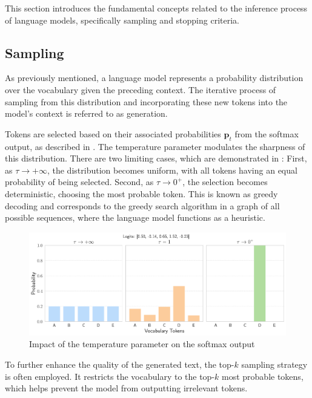 This section introduces the fundamental concepts related to the inference process of language models, specifically sampling and stopping criteria.

\subsection{Sampling}\label{sec:sampling}

As previously mentioned, a language model represents a probability distribution over the vocabulary given the preceding context. The iterative process of sampling from this distribution and incorporating these new tokens into the model's context is referred to as generation.

Tokens are selected based on their associated probabilities \(\mathbf{p}_t\) from the softmax output, as described in . The temperature parameter modulates the sharpness of this distribution. There are two limiting cases, which are demonstrated in : First, as \(\tau \to +\infty\), the distribution becomes uniform, with all tokens having an equal probability of being selected. Second, as \(\tau \to 0^+\), the selection becomes deterministic, choosing the most probable token. This is known as greedy decoding and corresponds to the greedy search algorithm in a graph of all possible sequences, where the language model functions as a heuristic.

\begin{figure}[ht]
    \centering
    \includegraphics[width=\textwidth]{figures/softmax-temperature.pdf}
    \caption{Impact of the temperature parameter on the softmax output}\label{fig:softmax-temperature}
\end{figure}

To further enhance the quality of the generated text, the top-\(k\) sampling strategy is often employed. It restricts the vocabulary to the top-\(k\) most probable tokens, which helps prevent the model from outputting irrelevant tokens.

